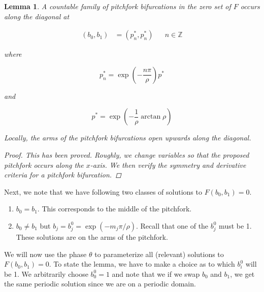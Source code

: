 \documentclass[12pt]{article}
\def\Z{{\mathbb Z}}
\newtheorem{lemma}{Lemma}
\begin{document}
\begin{lemma}\label{pitchforkF}
A countable family of pitchfork bifurcations in the zero set of $F$ occurs along the diagonal at 

\begin{align*}
(b_0, b_1) &= (p_n^*, p_n^*) && n \in \Z
\end{align*}

where 

\begin{equation}
p^*_n = \exp\left(-\frac{n \pi}{\rho} \right) p^*
\end{equation}

and 

\begin{equation}
p^* = \exp \left( -\frac{1}{\rho} \arctan \rho \right)
\end{equation}

Locally, the arms of the pitchfork bifurcations open upwards along the diagonal.
\begin{proof}
This has been proved. Roughly, we change variables so that the proposed pitchfork occurs along the $x$-axis. We then verify the symmetry and derivative criteria for a pitchfork bifurcation.
\end{proof}
\end{lemma}

Next, we note that we have following two classes of solutions to $F(b_0,b_1) = 0$. 

\begin{enumerate}
	\item $b_0 = b_1$. This corresponds to the middle of the pitchfork.
	\item $b_0 \neq b_1$ but $b_j = b_j^0 = \exp(-m_j \pi / \rho )$. Recall that one of the $b_j^0$ must be 1. These solutions are on the arms of the pitchfork.
\end{enumerate}

We will now use the phase $\theta$ to parameterize all (relevant) solutions to $F(b_0, b_1) = 0$. To state the lemma, we have to make a choice as to which $b_i^0$ will be 1. We arbitrarily choose $b_0^0 = 1$ and note that we if we swap $b_0$ and $b_1$, we get the same periodic solution since we are on a periodic domain.
\end{document}

